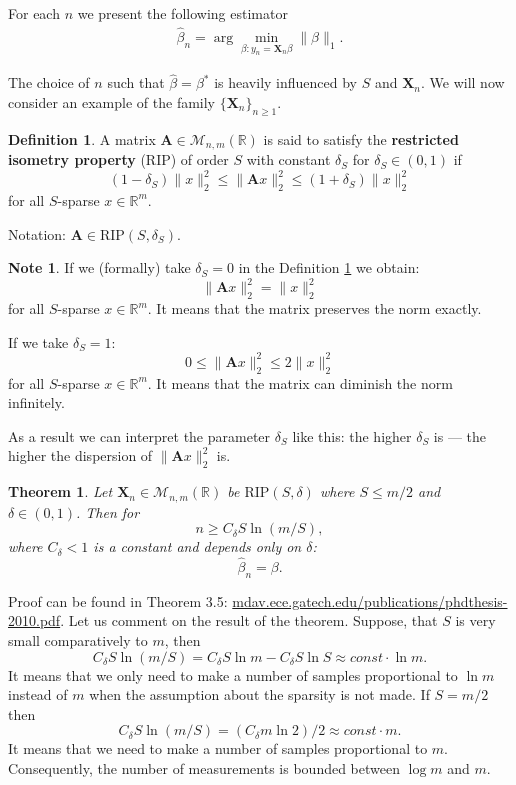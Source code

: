 \documentclass[11pt]{article}
\numberwithin{equation}{section}
\newtheorem{theorem}{Theorem}[section]
\theoremstyle{definition}
\newtheorem{remark}{Note}[section]
\newtheorem{definition}{Definition}[section]
\begin{document}
For each $n$ we present the following estimator
\begin{gather}
    \label{eq:noiselessBeta}
    \hat \beta_n = \arg \min_{\beta: y_n = \mathbf X_n \beta} \|\beta\|_1.
\end{gather}

The choice of $n$ such that $\hat \beta = \beta^*$ is heavily influenced by $S$ and $\mathbf X_n$.
We will now consider an example of the family $\{\mathbf X_n\}_{n \geqslant 1}$.

\begin{definition}
    \label{def:rip}
    A matrix $\mathbf A \in \mathcal M_{n, m}(\mathbb R)$ is said to satisfy the \textbf{restricted isometry property} (RIP) of order $S$ with constant $\delta_S$ for $\delta_S \in (0, 1)$ if
    $$ (1 - \delta_S) \|x\|_2^2 \leqslant \|\mathbf A x\|_2^2 \leqslant (1 + \delta_S) \|x\|_2^2 $$
    for all $S$-sparse $x \in \mathbb R^m$.
    
    Notation: $\mathbf A \in \textrm{RIP}(S, \delta_S)$.
\end{definition}

\begin{remark}
    \label{rem:def_rip}
    If we (formally) take $\delta_S = 0$ in the Definition \ref{def:rip} we obtain:
    $$ \|\mathbf A x\|_2^2 = \|x\|_2^2 $$
    for all $S$-sparse $x \in \mathbb R^m$.
    It means that the matrix preserves the norm exactly.

    If we take $\delta_S = 1$:
    $$ 0 \leqslant \|\mathbf A x\|_2^2 \leqslant 2 \|x\|_2^2 $$
    for all $S$-sparse $x \in \mathbb R^m$.
    It means that the matrix can diminish the norm infinitely.

    As a result we can interpret the parameter $\delta_S$ like this: the higher $\delta_S$ is --- the higher the dispersion of $\|\mathbf A x\|_2^2$ is.
\end{remark}

\begin{theorem}
    \label{theorem:CSforRIP}
    Let $\mathbf X_n \in \mathcal M_{n, m} (\mathbb R)$ be $\textrm{RIP}(S, \delta)$ where $S \leq m / 2$ and $\delta \in (0, 1)$. Then for
    $$ n \geqslant C_\delta S \ln(m / S), $$
    where $C_\delta < 1$ is a constant and depends only on $\delta$:
    $$ \hat \beta_n = \beta. $$
\end{theorem}

Proof can be found in Theorem 3.5: \url{mdav.ece.gatech.edu/publications/phdthesis-2010.pdf}.
Let us comment on the result of the theorem.
Suppose, that $S$ is very small comparatively to $m$, then
$$ C_\delta S \ln(m / S) = C_\delta S \ln m - C_\delta S \ln S \approx const \cdot \ln m. $$
It means that we only need to make a number of samples proportional to $\ln m$ instead of $m$ when the assumption about the sparsity is not made.
If $S = m / 2$ then
$$ C_\delta S \ln(m / S) = (C_\delta m \ln 2) / 2 \approx const \cdot m. $$
It means that we need to make a number of samples proportional to $m$.
Consequently, the number of measurements is bounded between $\log m$ and $m$.
\end{document}

